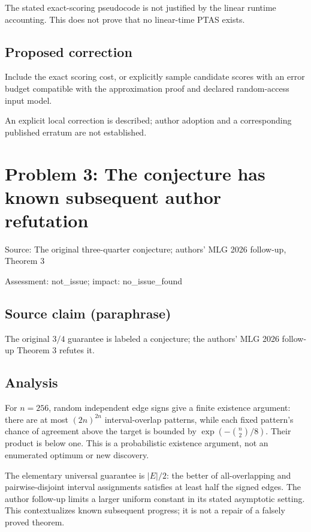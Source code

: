 \documentclass[11pt]{article}
\begin{document}
The stated exact-scoring pseudocode is not justified by the linear runtime accounting. This does not prove that no linear-time PTAS exists.

\subsection*{Proposed correction}

Include the exact scoring cost, or explicitly sample candidate scores with an error budget compatible with the approximation proof and declared random-access input model.

An explicit local correction is described; author adoption and a corresponding published erratum are not established.

\section*{Problem 3: The conjecture has known subsequent author refutation}

Source: The original three-quarter conjecture; authors’ MLG 2026 follow-up, Theorem 3

Assessment: not\_issue; impact: no\_issue\_found

\subsection*{Source claim (paraphrase)}

The original \(3/4\) guarantee is labeled a conjecture; the authors’ MLG 2026 follow-up Theorem 3 refutes it.

\subsection*{Analysis}

For \(n=256\), random independent edge signs give a finite existence argument: there are at most \((2n)^{2n}\) interval-overlap patterns, while each fixed pattern’s chance of agreement above the target is bounded by \(\exp(-\binom n2/8)\). Their product is below one. This is a probabilistic existence argument, not an enumerated optimum or new discovery.

The elementary universal guarantee is \(|E|/2\): the better of all-overlapping and pairwise-disjoint interval assignments satisfies at least half the signed edges. The author follow-up limits a larger uniform constant in its stated asymptotic setting. This contextualizes known subsequent progress; it is not a repair of a falsely proved theorem.
\end{document}

